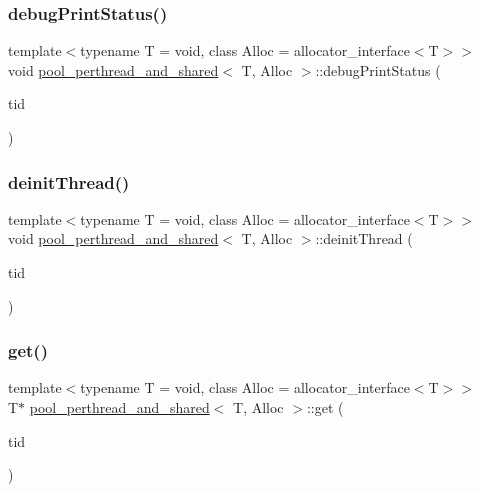 \subsubsection{\texorpdfstring{debug\+Print\+Status()}{debugPrintStatus()}}
{\footnotesize\ttfamily template$<$typename T  = void, class Alloc  = allocator\+\_\+interface$<$\+T$>$$>$ \\
void \hyperlink{classpool__perthread__and__shared}{pool\+\_\+perthread\+\_\+and\+\_\+shared}$<$ T, Alloc $>$\+::debug\+Print\+Status (\begin{DoxyParamCaption}\item[{const int}]{tid }\end{DoxyParamCaption})\hspace{0.3cm}{\ttfamily [inline]}}

\mbox{\label{classpool__perthread__and__shared_a3a48ef748d4e73fb2c01b608d18fb56f}} 
\subsubsection{\texorpdfstring{deinit\+Thread()}{deinitThread()}}
{\footnotesize\ttfamily template$<$typename T  = void, class Alloc  = allocator\+\_\+interface$<$\+T$>$$>$ \\
void \hyperlink{classpool__perthread__and__shared}{pool\+\_\+perthread\+\_\+and\+\_\+shared}$<$ T, Alloc $>$\+::deinit\+Thread (\begin{DoxyParamCaption}\item[{const int}]{tid }\end{DoxyParamCaption})\hspace{0.3cm}{\ttfamily [inline]}}

\mbox{\label{classpool__perthread__and__shared_ad52113553f51867ba3db6a882e5a32bb}} 
\subsubsection{\texorpdfstring{get()}{get()}}
{\footnotesize\ttfamily template$<$typename T  = void, class Alloc  = allocator\+\_\+interface$<$\+T$>$$>$ \\
T$\ast$ \hyperlink{classpool__perthread__and__shared}{pool\+\_\+perthread\+\_\+and\+\_\+shared}$<$ T, Alloc $>$\+::get (\begin{DoxyParamCaption}\item[{const int}]{tid }\end{DoxyParamCaption})\hspace{0.3cm}{\ttfamily [inline]}}

